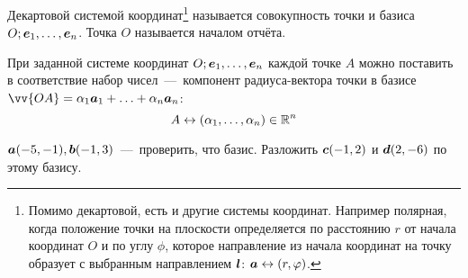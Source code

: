 \documentclass[a4paper,12pt]{article}
\begin{document}
  \begin{definition}
    Декартовой системой координат\footnote{Помимо декартовой, есть и другие системы координат. Например полярная, когда положение точки на плоскости определяется по расстоянию $r$ от начала координат $O$ и по углу $\phi$, которое направление из начала координат на точку образует с выбранным направлением $\boldsymbol l$: $\bds a \hm\leftrightarrow (r, \phi)$.} называется совокупность точки и базиса $O; \boldsymbol e_1, \ldots, \boldsymbol e_n$.
    Точка $O$ называется началом отчёта.
  \end{definition}
  
  \begin{remark}
    При заданной системе координат $O; \boldsymbol e_1, \ldots, \boldsymbol e_n$ каждой точке $A$ можно поставить в соответствие набор чисел~---~компонент радиуса-вектора точки в базисе $\vv{OA} \hm= \alpha_1 \bds a_1 \hm+ \ldots \hm+ \alpha_n \bds a_n$:
    \[
      A \leftrightarrow (\alpha_1, \ldots, \alpha_n) \in \operatorname{\mathbb R}^n
    \]
  \end{remark}
  
  
  \begin{problem}[1.6]
    $\boldsymbol a(-5, -1), \boldsymbol b(-1, 3)$~---~проверить, что базис.
    Разложить $\boldsymbol c(-1, 2)$ и $\boldsymbol d(2, -6)$ по этому базису.
  \end{problem}
  
\end{document}
